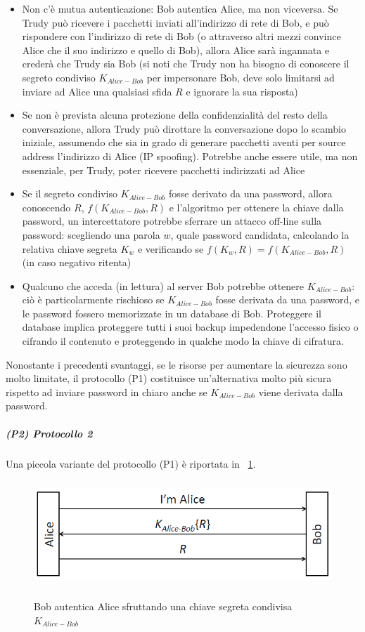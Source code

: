 \begin{itemize}
	\item Non c'è mutua autenticazione: Bob autentica Alice, ma non viceversa. Se Trudy può ricevere i pacchetti inviati all'indirizzo di rete di Bob, e può rispondere con l'indirizzo di rete di Bob (o attraverso altri mezzi convince Alice che il suo indirizzo e quello di Bob), allora Alice sarà ingannata e crederà che Trudy sia Bob (si noti che Trudy non ha bisogno di conoscere il segreto condiviso $K_{Alice-Bob}$ per impersonare Bob, deve solo limitarsi ad inviare ad Alice una qualsiasi sfida $R$ e ignorare la sua risposta)
	\item Se non è prevista alcuna protezione della confidenzialità del resto della conversazione, allora Trudy può dirottare la conversazione dopo lo scambio iniziale, assumendo che sia in grado di generare pacchetti aventi per source address l'indirizzo di Alice (IP spoofing). Potrebbe anche essere utile, ma non essenziale, per Trudy, poter ricevere pacchetti indirizzati ad Alice
	\item Se il segreto condiviso $K_{Alice-Bob}$ fosse derivato da una password, allora conoscendo $R$, $f(K_{Alice-Bob}, R)$ e l'algoritmo per ottenere la chiave dalla password, un intercettatore potrebbe sferrare un attacco off-line sulla password: scegliendo una parola $w$, quale password candidata, calcolando la relativa chiave segreta $K_{w}$ e verificando se $f(K_{w}, R) = f(K_{Alice-Bob}, R)$ (in caso negativo ritenta)
	\item Qualcuno che acceda (in lettura) al server Bob potrebbe ottenere $K_{Alice-Bob}$: ciò è particolarmente rischioso se $K_{Alice-Bob}$ fosse derivata da una password, e le password fossero memorizzate in un database di
	Bob. Proteggere il database implica proteggere tutti i suoi backup impedendone l'accesso fisico o cifrando il contenuto e proteggendo in qualche modo la chiave di cifratura.
\end{itemize}
Nonostante i precedenti svantaggi, se le risorse per aumentare la sicurezza sono molto limitate, il protocollo (P1) costituisce un'alternativa molto più sicura rispetto ad inviare password in chiaro anche se $K_{Alice-Bob}$ viene derivata dalla password.
\subparagraph{(P2) Protocollo 2}
Una piccola variante del protocollo (P1) è riportata in \figurename~\ref{fig:ImgS17bis}.
\begin{figure}[htbp]
	\centering%
	\subfigure%
	{\includegraphics[height=4cm, width=12cm, keepaspectratio]{Immagini/autenticazione/ImgS17bis.png}}
	\caption{Bob autentica Alice sfruttando una chiave segreta condivisa $K_{Alice-Bob}$\label{fig:ImgS17bis}} 	
\end{figure}
